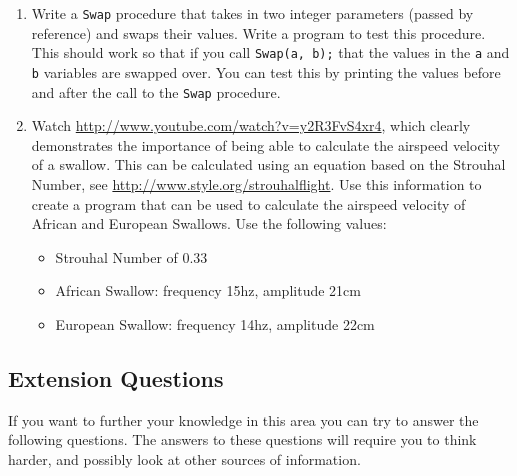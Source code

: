\begin{enumerate}
  \item Write a \texttt{Swap} procedure that takes in two integer parameters (passed by reference) and swaps their values. Write a program to test this procedure. This should work so that if you call \texttt{Swap(a, b);} that the values in the \texttt{a} and \texttt{b} variables are swapped over. You can test this by printing the values before and after the call to the \texttt{Swap} procedure.
  \item Watch \url{http://www.youtube.com/watch?v=y2R3FvS4xr4}, which clearly demonstrates the importance of being able to calculate the airspeed velocity of a swallow. This can be calculated using an equation based on the Strouhal Number, see \url{http://www.style.org/strouhalflight}. Use this information to create a program that can be used to calculate the airspeed velocity of African and European Swallows. Use the following values:
  \begin{itemize}
    \item Strouhal Number of 0.33
    \item African Swallow: frequency 15hz, amplitude 21cm
    \item European Swallow: frequency 14hz, amplitude 22cm
  \end{itemize}
\end{enumerate}

\clearpage
\subsection{Extension Questions} %
\label{sub:extension_questions_data}

If you want to further your knowledge in this area you can try to answer the following questions. The answers to these questions will require you to think harder, and possibly look at other sources of information.

